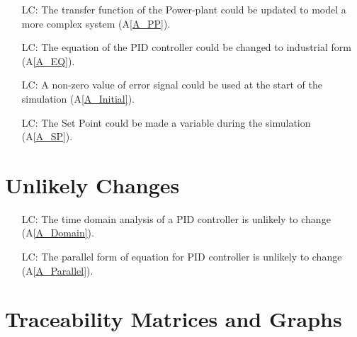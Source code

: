 \documentclass[12pt]{article}
\newcommand{\aref}[1]{A\ref{#1}}
\newcounter{lcnum} %
\begin{document}
\noindent \begin{itemize}

\item[LC\refstepcounter{lcnum}\thelcnum\label{LC_PP}:]  The transfer function of the Power-plant could be updated 
    to model a more complex system (\aref{A_PP}).
    
\item[LC\refstepcounter{lcnum}\thelcnum\label{LC_EQ}:] The equation of the 
    PID controller could be changed to industrial form (\aref{A_EQ}).
    
\item[LC\refstepcounter{lcnum}\thelcnum\label{LC_Initial}:] A non-zero value
    of error signal could be used at the start of the simulation 
    (\aref{A_Initial}).
    
\item[LC\refstepcounter{lcnum}\thelcnum\label{LC_SP}:] The Set Point could be 
    made a variable during the simulation (\aref{A_SP}).

\end{itemize}

\section{Unlikely Changes}    

\noindent \begin{itemize}

\item[LC\refstepcounter{lcnum}\thelcnum\label{LC_U_TD}:]  The time domain analysis of a PID controller is unlikely to 
    change (\aref{A_Domain}).
    
\item[LC\refstepcounter{lcnum}\thelcnum\label{LC_U_Parallel}:]  The parallel form of equation for PID controller is 
    unlikely to change (\aref{A_Parallel}).

\end{itemize}

\section{Traceability Matrices and Graphs}
\end{document}

